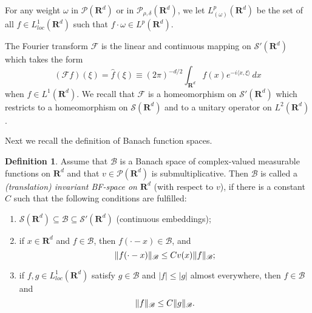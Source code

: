 \documentclass[12pt,a4paper,reqno]{amsart}
\numberwithin{equation}{section}
\numberwithin{thm}{section}
\theoremstyle{definition}
\newtheorem{defn}[thm]{Definition}
\theoremstyle{remark}
\begin{document}
\par

For any weight $\omega$ in $\mathscr P({\mathbf R^{d}})$ or in $\mathscr P_{\rho
,\delta}({\mathbf R^{d}})$, we let $L^p_{(\omega )}({\mathbf R^{d}})$ be the set of all
$f\in L^1_{loc}({\mathbf R^{d}})$ such that $f\cdot \omega \in L^p({\mathbf R^{d}})$.

\medspace

The Fourier transform $\mathscr F$ is the linear and continuous
mapping on $\mathscr S'({\mathbf R^{d}})$ which takes the form
$$
(\mathscr Ff)(\xi )= \widehat f(\xi ) \equiv (2\pi )^{-d/2}\int _{{\mathbf R^{{d}}}} f(x)e^{-i{\langle x,\xi\rangle} }\, dx
$$
when $f\in L^1({\mathbf R^{d}})$. We recall that $\mathscr F$ is a homeomorphism
on $\mathscr S'({\mathbf R^{d}})$ which restricts to a homeomorphism on $\mathscr
S({\mathbf R^{d}})$ and to a unitary operator on $L^2({\mathbf R^{d}})$.

\medspace

Next we recall the definition of Banach function spaces.

\par

\begin{defn}\label{BFspaces}
Assume that $\mathscr B$ is a Banach space of complex-valued
measurable functions on ${\mathbf R^{d}}$ and that $v \in \mathscr P({\mathbf R^{{d}}})$
is submultiplicative.
Then $\mathscr B$ is called a \emph{(translation) invariant
BF-space on ${\mathbf R^{d}}$} (with respect to $v$), if there is a constant $C$
such that the following conditions are fulfilled:
\begin{enumerate}
\item $\mathscr S({\mathbf R^{d}})\subseteq \mathscr
B\subseteq \mathscr S'({\mathbf R^{d}})$ (continuous embeddings);

{\vspace{0.1cm}}

\item if $x\in {\mathbf R^{d}}$ and $f\in \mathscr B$, then $f(\cdot -x)\in
\mathscr B$, and
\begin{equation}\label{translmultprop1}
{\Vert {f(\cdot -x)}\Vert _{{\mathscr B}}}\le Cv(x){\Vert {f}\Vert _{{\mathscr B}}}\text ;
\end{equation}

{\vspace{0.1cm}}

\item if $f,g\in L^1_{loc}({\mathbf R^{d}})$ satisfy $g\in \mathscr B$  and $|f|
\le |g|$ almost everywhere, then $f\in \mathscr B$ and
$$
{\Vert f\Vert _{{\mathscr B}}}\le C{\Vert g\Vert _{{\mathscr B}}}\text .
$$
\end{enumerate}
\end{defn}
\end{document}
